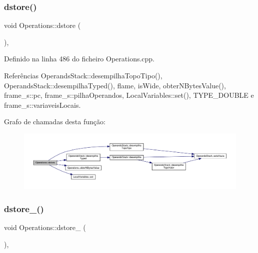 \subsubsection{\texorpdfstring{dstore()}{dstore()}}
{\footnotesize\ttfamily void Operations\+::dstore (\begin{DoxyParamCaption}{ }\end{DoxyParamCaption})\hspace{0.3cm}{\ttfamily [static]}, {\ttfamily [private]}}



Definido na linha 486 do ficheiro Operations.\+cpp.



Referências Operands\+Stack\+::desempilha\+Topo\+Tipo(), Operands\+Stack\+::desempilha\+Typed(), flame, is\+Wide, obter\+N\+Bytes\+Value(), frame\+\_\+s\+::pc, frame\+\_\+s\+::pilha\+Operandos, Local\+Variables\+::set(), T\+Y\+P\+E\+\_\+\+D\+O\+U\+B\+LE e frame\+\_\+s\+::variaveis\+Locais.

Grafo de chamadas desta função\+:
\nopagebreak
\begin{figure}[H]
\begin{center}
\leavevmode
\includegraphics[width=350pt]{classOperations_a83fb57afed30b1223f8485492f9d9958_cgraph}
\end{center}
\end{figure}
\mbox{\label{classOperations_a54dd25692395f6671a3a8e21c73eef6d}} 
\subsubsection{\texorpdfstring{dstore\+\_()}{dstore\_0()}}
{\footnotesize\ttfamily void Operations\+::dstore\+\_ (\begin{DoxyParamCaption}{ }\end{DoxyParamCaption})\hspace{0.3cm}{\ttfamily [static]}, {\ttfamily [private]}}



